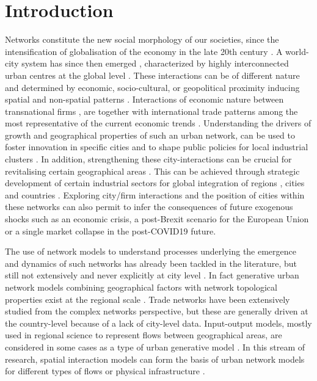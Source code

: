 \documentclass[10pt,letterpaper]{article}
\begin{document}
\linenumbers


\section*{Introduction}

Networks constitute the new social morphology of our societies, since the intensification of globalisation of the economy in the late 20th century \cite{castells2000networksociety}. A world-city system has since then emerged \cite{taylor2001specification}, characterized by highly interconnected urban centres at the global level \cite{sassen1991}. These interactions can be of different nature and determined by economic, socio-cultural, or geopolitical proximity inducing spatial and non-spatial patterns \cite{martinus2018global}. Interactions of economic nature between transnational firms \cite{derudder2018central}, are together with international trade patterns among the most representative of the current economic trends \cite{taylor2001specification}. Understanding the drivers of growth and geographical properties of such an urban network, can be used to foster innovation in specific cities and to shape public policies for local industrial clusters \cite{turkina2016structure}. In addition, strengthening these city-interactions can be crucial for revitalising certain geographical areas \cite{Clarke2018}. This can be achieved through strategic development of certain industrial sectors for global integration of regions \cite{dawley2019creating}, cities \cite{gluckler2016relational} and countries \cite{martinus2019brokerage}. Exploring city/firm interactions \cite{storme2019introducing} and the position of cities within these networks \cite{gluckler2016relational} can also permit to infer the consequences of future exogenous shocks such as an economic crisis, a post-Brexit scenario for the European Union or a single market collapse in the post-COVID19 future.

The use of network models to understand processes underlying the emergence and dynamics of such networks has already been tackled in the literature, but still not extensively and never explicitly at city level \cite{taylor2001specification}. In fact generative urban network models combining geographical factors with network topological properties exist at the regional scale {\cite{dai2016simulating}}. Trade networks have been extensively studied from the complex networks perspective, but these are generally driven at the country-level \cite{garlaschelli2005structure} because of a lack of city-level data. Input-output models, mostly used in regional science to represent flows between geographical areas, are considered in some cases as a type of urban generative model \cite{jin1993generation}. In this stream of research, spatial interaction models \cite{dennett2013multilevel} can form the basis of urban network models for different types of flows \cite{dai2016generative} or physical infrastructure \cite{raimbault2018indirect}.  
\end{document}
